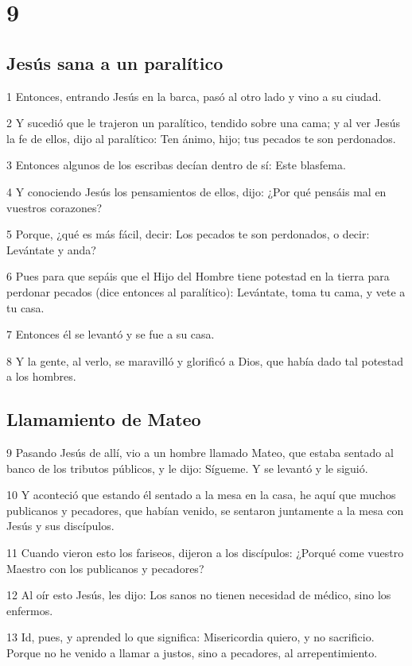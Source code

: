 \chapter{9}

\section*{Jesús sana a un paralítico}

\par 1 Entonces, entrando Jesús en la barca, pasó al otro lado y vino a su ciudad.
\par 2 Y sucedió que le trajeron un paralítico, tendido sobre una cama; y al ver Jesús la fe de ellos, dijo al paralítico: Ten ánimo, hijo; tus pecados te son perdonados.
\par 3 Entonces algunos de los escribas decían dentro de sí: Este blasfema.
\par 4 Y conociendo Jesús los pensamientos de ellos, dijo: ¿Por qué pensáis mal en vuestros corazones?
\par 5 Porque, ¿qué es más fácil, decir: Los pecados te son perdonados, o decir: Levántate y anda?
\par 6 Pues para que sepáis que el Hijo del Hombre tiene potestad en la tierra para perdonar pecados (dice entonces al paralítico): Levántate, toma tu cama, y vete a tu casa.
\par 7 Entonces él se levantó y se fue a su casa.
\par 8 Y la gente, al verlo, se maravilló y glorificó a Dios, que había dado tal potestad a los hombres.

\section*{Llamamiento de Mateo}

\par 9 Pasando Jesús de allí, vio a un hombre llamado Mateo, que estaba sentado al banco de los tributos públicos, y le dijo: Sígueme. Y se levantó y le siguió.
\par 10 Y aconteció que estando él sentado a la mesa en la casa, he aquí que muchos publicanos y pecadores, que habían venido, se sentaron juntamente a la mesa con Jesús y sus discípulos.
\par 11 Cuando vieron esto los fariseos, dijeron a los discípulos: ¿Porqué come vuestro Maestro con los publicanos y pecadores?
\par 12 Al oír esto Jesús, les dijo: Los sanos no tienen necesidad de médico, sino los enfermos.
\par 13 Id, pues, y aprended lo que significa: Misericordia quiero, y no sacrificio. Porque no he venido a llamar a justos, sino a pecadores, al arrepentimiento.

